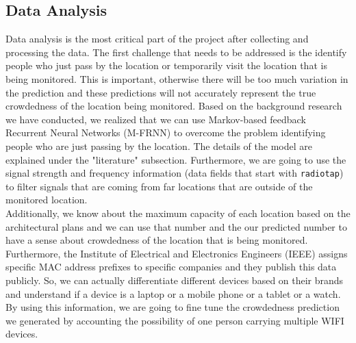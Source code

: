 \documentclass[journal, 12pt]{IEEEtran}
\begin{document}
\subsection{Data Analysis} 
\noindent Data analysis is the most critical part of the project after collecting and processing the data. The first challenge that needs to be addressed is the identify people who just pass by the location or temporarily visit the location that is being monitored. This is important, otherwise there will be too much variation in the prediction and these predictions will not accurately represent the true crowdedness of the location being monitored. Based on the background research we have conducted, we realized that we can use Markov-based feedback  Recurrent Neural Networks (M-FRNN) to overcome the problem identifying people who are just passing by the location. The details of the model are explained under the "literature" subsection. Furthermore, we are going to use the signal strength and frequency information (data fields that start with \texttt{radiotap}) to filter signals that are coming from far locations that are outside of the monitored location. \\

\noindent Additionally, we know about the maximum capacity of each location based on the architectural plans and we can use that number and the our predicted number to have a sense about crowdedness of the location that is being monitored. Furthermore, the Institute of Electrical and Electronics Engineers (IEEE) assigns specific MAC address prefixes to specific companies and they publish this data publicly. So, we can actually differentiate different devices based on their brands and understand if a device is a laptop or a mobile phone or a tablet or a watch. By using this information, we are going to fine tune the crowdedness prediction we generated by accounting the possibility of one person carrying multiple WIFI devices.


\end{document}
